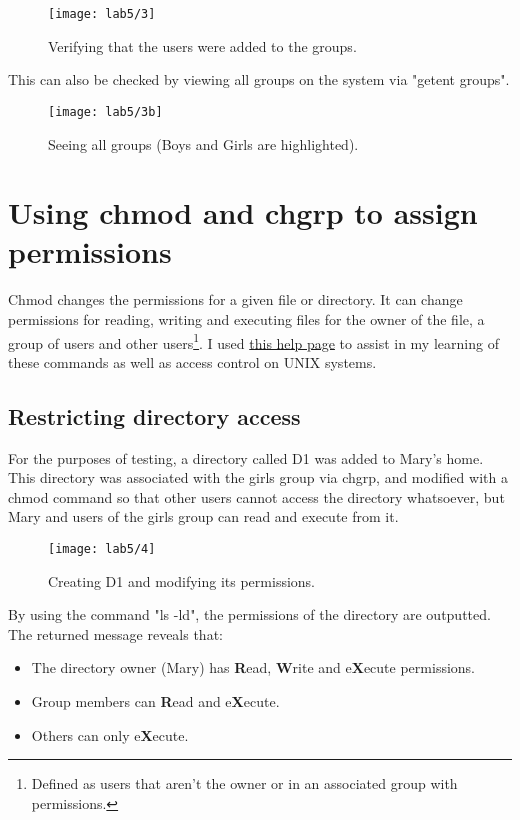 \begin{figure}[H]
    \centering
    \texttt{[image: lab5/3]}
    \caption{Verifying that the users were added to the groups.}
    \label{fig:checkGroups}
\end{figure}

This can also be checked by viewing all groups on the system via "getent groups".

\begin{figure}[H]
    \centering
    \texttt{[image: lab5/3b]}
    \caption{Seeing all groups (Boys and Girls are highlighted).}
    \label{fig:getent}
\end{figure}

\pagebreak

\section{Using chmod and chgrp to assign permissions}\label{sec:using-chmod}
Chmod changes the permissions for a given file or directory.
It can change permissions for reading, writing and executing files for the owner of the file,
a group of users and other users\footnote{Defined as users that aren't the owner or in an
associated group with permissions.}.
I used \href{https://docs.nersc.gov/filesystems/unix-file-permissions/}{this help page}
\autocite{chmodHelp} to assist in my learning of these commands as well as access control on UNIX
systems.

\subsection{Restricting directory access}\label{subsec:chgrp}
For the purposes of testing, a directory called D1 was added to Mary's home.
This directory was associated with the girls group via chgrp, and modified with a chmod
command so that other users cannot access the directory whatsoever, but Mary and users
of the girls group can read and execute from it.

\begin{figure}[H]
    \centering
    \texttt{[image: lab5/4]}
    \caption{Creating D1 and modifying its permissions.}
    \label{fig:D1}
\end{figure}

\noindent By using the command "ls -ld", the permissions of the directory are outputted.
The returned message reveals that:
\begin{itemize}
    \item The directory owner (Mary) has \textbf{R}ead, \textbf{W}rite and e\textbf{X}ecute permissions.
    \item Group members can \textbf{R}ead and e\textbf{X}ecute.
    \item Others can only e\textbf{X}ecute.
\end{itemize}

